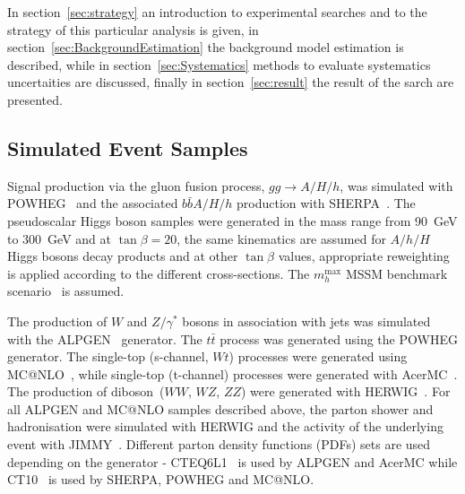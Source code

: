 
In section~\ref{sec:strategy} an introduction to experimental searches and to the strategy
of this particular analysis is given, in section~\ref{sec:BackgroundEstimation} the background model estimation is described, 
while in section~\ref{sec:Systematics} methods to evaluate systematics uncertaities are discussed, finally 
in section~\ref{sec:result} the result of the sarch are presented.


\subsection{Simulated Event Samples}
\label{sec:SimSamples}

Signal production via the gluon fusion process, $gg\rightarrow A/H/h$,
was simulated with POWHEG~\cite{POWHEG} and the associated
$b\bar{b}A/H/h$ production with SHERPA~\cite{SHERPA}.  The
pseudoscalar Higgs boson samples were generated in the mass range from
90~GeV to 300~GeV and at $\tan\beta = 20$, the same kinematics
are assumed for $A/h/H$ Higgs bosons decay products and at other
$\tan\beta$ values, appropriate reweighting is applied according to the
different cross-sections. The $m_h^{\mathrm{max}}$ MSSM benchmark
scenario~\cite{MSSMmhmax} is assumed.

The production of $W$ and $Z/\gamma^*$ bosons in association with jets
was simulated with the ALPGEN~\cite{Alpgen} generator. 
The $t\bar{t}$ process was generated using the POWHEG generator. The single-top (s-channel, $Wt$)
processes were generated using MC@NLO~\cite{MCatNLO}, while single-top
(t-channel) processes were generated with AcerMC~\cite{AcerMC}.  The
production of diboson~($WW$, $WZ$, $ZZ$) were generated with
HERWIG~\cite{Herwig}.  For all ALPGEN and MC@NLO samples described
above, the parton shower and hadronisation were simulated with HERWIG
and the activity of the underlying event with JIMMY~\cite{JIMMY}.
Different parton density functions (PDFs) sets are used depending on
the generator - CTEQ6L1~\cite{CTEQ6} is used by ALPGEN and AcerMC while
CT10~\cite{CT10} is used by SHERPA, POWHEG and MC@NLO. 

